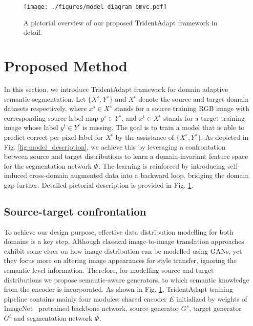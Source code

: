 \documentclass{bmvc2k}
\newcommand{\Fig}[1]{Fig. \ref{fig:#1}}
\begin{document}
\begin{figure}[]
\centering
\texttt{[image: ./figures/model\_diagram\_bmvc.pdf]}
\caption{A pictorial overview of our proposed TridentAdapt framework in detail.}
\label{fig:model_diagram}
\vspace{-3.5mm}
\end{figure}



\vspace{-3.5mm}
\section{Proposed Method}
\label{sec:proposed_method}
In this section, we introduce TridentAdapt framework for domain adaptive semantic segmentation. Let $\{X^s, Y^s\}$ and $X^t$ denote the source and target domain datasets respectively, where $x^s \in X^s$ stands for a source training RGB image with corresponding source label map $y^s \in Y^s$, and $x^t \in X^t$ stands for a target training image whose label $y^t \in Y^t$ is missing. The goal is to train a model that is able to predict correct per-pixel label for $X^t$ by the assistance of $\{X^s, Y^s\}$. As depicted in \Fig{model_description}, we achieve this by leveraging a confrontation between source and target distributions to learn a domain-invariant feature space for the segmentation network ${\Phi}$. The learning is reinforced by introducing self-induced cross-domain augmented data into a backward loop, bridging the domain gap further. Detailed pictorial description is provided in \Fig{model_diagram}.

\subsection{Source-target confrontation}
\label{sec:source-target}
To achieve our design purpose, effective data distribution modelling for both domains is a key step. Although classical image-to-image translation approaches~\cite{huang2018multimodal, liu2017unsupervised, zhu2017unpaired} exhibit some clues on how image distribution can be modelled using GANs, yet they focus more on altering image appearances for style transfer, ignoring the semantic level information. Therefore, for modelling source and target distributions we propose semantic-aware generators, to which semantic knowledge from the encoder is incorporated. As shown in \Fig{model_diagram}, TridentAdapt training pipeline contains mainly four modules: shared encoder ${E}$ initialized by weights of ImageNet~\cite{deng2009imagenet} pretrained backbone network, source generator ${G^{s}}$, target generator ${G^{t}}$ and segmentation network ${\Phi}$. 
\end{document}
